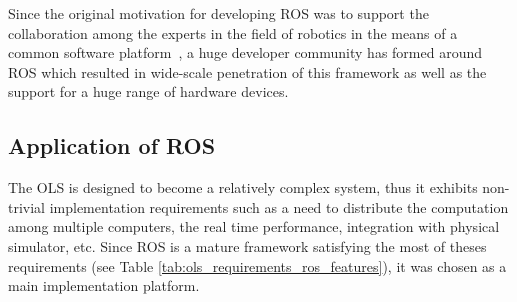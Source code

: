 Since the original motivation for developing ROS was to support the collaboration among the experts in the field of robotics in the means of a common software platform~\cite{ROS-an-open-source-Robot-Operating-System}, a huge developer community has formed around ROS which resulted in wide-scale penetration of this framework as well as the support for a huge range of hardware devices.

\subsection{Application of ROS}

The OLS is designed to become a relatively complex system, thus it exhibits non-trivial implementation requirements such as a need to distribute the computation among multiple computers, the real time performance, integration with physical simulator, etc. Since ROS is a mature framework satisfying the most of theses requirements (see Table \ref{tab:ols_requirements_ros_features}), it was chosen as a main implementation platform.


